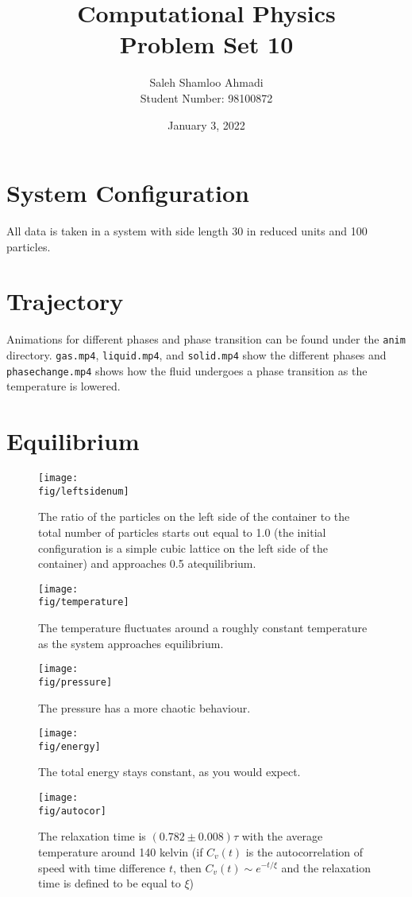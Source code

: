 \documentclass[12pt,a4paper]{article}
\title{Computational Physics\\Problem Set 10}
\author{Saleh Shamloo Ahmadi\\Student Number: 98100872}
\date{January 3, 2022}
\newcommand{\fig}{../fig}
\begin{document}
	\maketitle
	\section{System Configuration}
	All data is taken in a system with side length 30 in reduced units and 100 particles.

	\section{Trajectory}
	Animations for different phases and phase transition can be found under the \texttt{anim} directory.
	\texttt{gas.mp4}, \texttt{liquid.mp4}, and \texttt{solid.mp4} show the different phases and
	\texttt{phasechange.mp4} shows how the fluid undergoes a phase transition as the temperature is
	lowered.
	
	\section{Equilibrium}
	\begin{figure}[htb!]
		\centering
		\texttt{[image: \\fig/leftsidenum]}
		\caption{The ratio of the particles on the left side of the container to the total number of particles
			starts out equal to 1.0 (the initial configuration is a simple cubic lattice on the left side of the
			container) and approaches 0.5 atequilibrium.}
	\end{figure}
	\begin{figure}[htb!]
		\centering
		\texttt{[image: \\fig/temperature]}
		\caption{The temperature fluctuates around a roughly constant temperature as the system approaches equilibrium.}
	\end{figure}
	\begin{figure}[htb!]
		\centering
		\texttt{[image: \\fig/pressure]}
		\caption{The pressure has a more chaotic behaviour.}
	\end{figure}
	\begin{figure}[htb!]
		\centering
		\texttt{[image: \\fig/energy]}
		\caption{The total energy stays constant, as you would expect.}
	\end{figure}
	\begin{figure}[htb!]
		\centering
		\texttt{[image: \\fig/autocor]}
		\caption{The relaxation time is $(0.782 \pm 0.008)\tau$ with the average temperature around 140 kelvin
			(if $C_v(t)$ is the autocorrelation of speed with time difference $t$, then $C_v(t)\sim e^{-t/\xi}$
			and the relaxation time is defined to be equal to $\xi$)}
	\end{figure}
\end{document}
